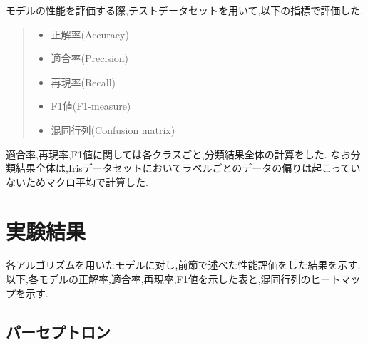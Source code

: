 \documentclass{jarticle}     %
\begin{document}
モデルの性能を評価する際,テストデータセットを用いて,以下の指標で評価した.

\begin{quote}
  \begin{itemize}
   \item 正解率(Accuracy)
   \item 適合率(Precision)
   \item 再現率(Recall)
   \item F1値(F1-measure)
   \item 混同行列(Confusion matrix)
  \end{itemize}
 \end{quote}
 適合率,再現率,F1値に関しては各クラスごと,分類結果全体の計算をした.
なお分類結果全体は,Irisデータセットにおいてラベルごとのデータの偏りは起こっていないためマクロ平均で計算した.\cite{macro}

\section{実験結果}
各アルゴリズムを用いたモデルに対し,前節で述べた性能評価をした結果を示す.以下,各モデルの正解率,適合率,再現率,F1値を示した表と,混同行列のヒートマップを示す.
\subsection{パーセプトロン}
\end{document}
